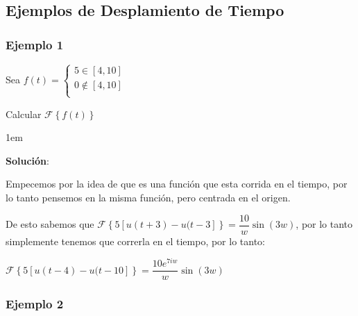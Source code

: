 \documentclass[12pt, fleqn]{report}                             %
\newenvironment{SmallIndentation}[1][0.75em]                    %
    {\begin{adjustwidth}{#1}{}\begin{footnotesize}}                 %
    {\end{footnotesize}\end{adjustwidth}}                           %
\newcommand{\Wrap}[1]{\left( #1 \right)}                        %
\newcommand{\Sin}[1]{\sin\Wrap{#1}}                             %
\newcommand{\FourierT}[1]{\mathscr{F} \left\{ #1 \right\} }     %
\begin{document}
                \clearpage
                \subsection{Ejemplos de Desplamiento de Tiempo}

                    \subsubsection{Ejemplo 1}

                        Sea $f(t) = \begin{cases}
                                        5 \in [4, 10]       \\
                                        0 \notin [4, 10]    \\
                                    \end{cases}$

                        Calcular $\FourierT{f(t)}$

                        \begin{SmallIndentation}[1em]
                            \textbf{Solución}:

                            Empecemos por la idea de que es una función que esta corrida en el tiempo, por lo tanto
                            pensemos en la misma función, pero centrada en el origen.

                            De esto sabemos que $\FourierT{5[u(t+3) - u(t-3]} = \dfrac{10}{w} \Sin{3w}$, por lo 
                            tanto simplemente tenemos que correrla en el tiempo, por lo tanto:

                            $\FourierT{5[u(t-4) - u(t-10]} = \dfrac{10e^{7iw}}{w} \Sin{3w}$

                        \end{SmallIndentation}


                    \subsubsection{Ejemplo 2}
\end{document}
